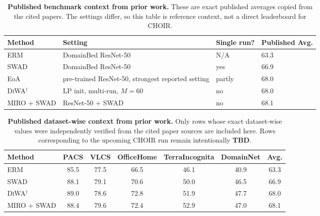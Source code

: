 \documentclass{article}
\newcommand{\TBD}{\textbf{TBD}}
\newcommand{\choir}{\textup{\textsc{CHOIR}}}
\newcommand{\swad}{\textup{\textsc{SWAD}}}
\newcommand{\diwa}{\textup{\textsc{DiWA}}}
\newcommand{\miro}{\textup{\textsc{MIRO}}}
\newcommand{\erm}{\textup{\textsc{ERM}}}
\begin{document}
\begin{table}[t]
    \centering
    \caption{\textbf{Published benchmark context from prior work.} These are exact published averages copied from the cited papers. The settings differ, so this table is reference context, not a direct leaderboard for \choir{}.}
    \label{tab:published_context}
    \small
    \setlength{\tabcolsep}{5pt}
    \begin{adjustbox}{max width=\linewidth}
    \begin{tabular}{@{}lp{5.4cm}ll@{}}
        \toprule
        Method & Setting & Single run? & Published Avg. \\
        \midrule
        \erm{} \citep{cha2021swad} & DomainBed ResNet-50 & N/A & 63.3 \\
        \swad{} \citep{cha2021swad} & DomainBed ResNet-50 & yes & 66.9 \\
        EoA \citep{arpit2021ensemble} & pre-trained ResNet-50, strongest reported setting & partly & 68.0 \\
        \diwa{}$^\dagger$ \citep{rame2022diwa} & LP init, multi-run, \(M=60\) & no & 68.0 \\
        \miro{} + \swad{} \citep{cha2022miro} & ResNet-50 + \swad{} & no & 68.1 \\
        \bottomrule
    \end{tabular}
    \end{adjustbox}
\end{table}

\begin{table}[t]
    \centering
    \caption{\textbf{Published dataset-wise context from prior work.} Only rows whose exact dataset-wise values were independently verified from the cited paper sources are included here. Rows corresponding to the upcoming \choir{} run remain intentionally \TBD{}.}
    \label{tab:published_dataset_context}
    \begin{tabular}{lcccccc}
        \toprule
        Method & PACS & VLCS & OfficeHome & TerraIncognita & DomainNet & Avg. \\
        \midrule
        \erm{} \citep{cha2021swad} & 85.5 & 77.5 & 66.5 & 46.1 & 40.9 & 63.3 \\
        \swad{} \citep{cha2021swad} & 88.1 & 79.1 & 70.6 & 50.0 & 46.5 & 66.9 \\
        \diwa{}$^\dagger$ \citep{rame2022diwa} & 89.0 & 78.6 & 72.8 & 51.9 & 47.7 & 68.0 \\
        \miro{} + \swad{} \citep{cha2022miro} & 88.4 & 79.6 & 72.4 & 52.9 & 47.0 & 68.1 \\
        \bottomrule
    \end{tabular}
\end{table}
\end{document}
